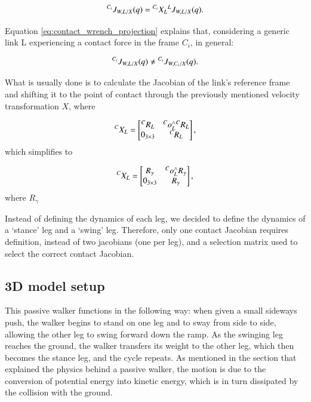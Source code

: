 \begin{equation}
    {}^{C_i}{J}_{W,L/X}(q) = {}^{C_i}{X}_{L}{}^{L}{J}_{W,L/X}(q).
\end{equation}

Equation \ref{eq:contact_wrench_projection} explains that, considering a generic link L experiencing a contact force in the frame $C_i$, in general:

\begin{equation}
    {}^{C_i}{J}_{W, L/X}(q) \neq {}^{C_i}{J}_{W,C_i/X}(q).
\end{equation}

What is usually done is to calculate the Jacobian of the link's reference frame and shifting it to the point of contact through the previously mentioned velocity transformation $X$, where

\[
{}^{C}{X}_{L} = 
\begin{bmatrix}
    {}^{C}{R}_{L} & {}^{C}{o}_{L}^{\wedge}{}^{C}{R}_{L}\\
    0_{3\times3} & {}^{C}{R}_{L}
\end{bmatrix},
\]
which simplifies to

\begin{equation}
    {}^{C}{X}_{L} =
    \begin{bmatrix}
        R_{\gamma} & {}^{C}{o}_{L}^{\wedge}R_\gamma\\
        0_{3\times3} & R_{\gamma}
    \end{bmatrix},
\end{equation}
where $R_{\gamma}$ 

Instead of defining the dynamics of each leg, we decided to define the dynamics of a `stance' leg and a `swing' leg.
Therefore, only one contact Jacobian requires definition, instead of two jacobians (one per leg), and a selection matrix used to select the correct contact Jacobian.



\subsection{3D model setup}
This passive walker functions in the following way: when given a small sideways push, the walker begins to stand on one leg and to sway from side to side, allowing the other leg to swing forward down the ramp.
As the swinging leg reaches the ground, the walker transfers its weight to the other leg, which then becomes the stance leg, and the cycle repeats.
As mentioned in the section that explained the physics behind a passive walker, the motion is due to the conversion of potential energy into kinetic energy, which is in turn dissipated by the collision with the ground.

